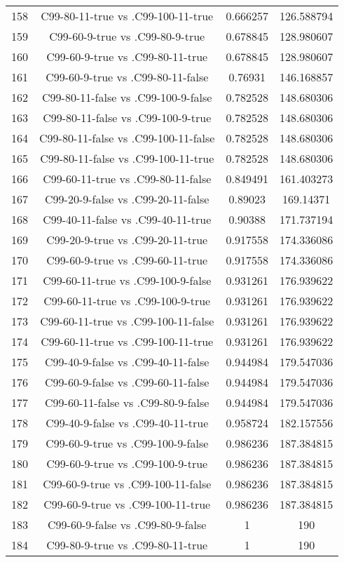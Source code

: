 \documentclass[a4paper,10pt]{article}
\begin{document}
\begin{landscape}
\begin{table}[!htp]
\begin{tabular}{cccc}
158&C99-80-11-true vs .C99-100-11-true&0.666257&126.588794\\
159&C99-60-9-true vs .C99-80-9-true&0.678845&128.980607\\
160&C99-60-9-true vs .C99-80-11-true&0.678845&128.980607\\
161&C99-60-9-true vs .C99-80-11-false&0.76931&146.168857\\
162&C99-80-11-false vs .C99-100-9-false&0.782528&148.680306\\
163&C99-80-11-false vs .C99-100-9-true&0.782528&148.680306\\
164&C99-80-11-false vs .C99-100-11-false&0.782528&148.680306\\
165&C99-80-11-false vs .C99-100-11-true&0.782528&148.680306\\
166&C99-60-11-true vs .C99-80-11-false&0.849491&161.403273\\
167&C99-20-9-false vs .C99-20-11-false&0.89023&169.14371\\
168&C99-40-11-false vs .C99-40-11-true&0.90388&171.737194\\
169&C99-20-9-true vs .C99-20-11-true&0.917558&174.336086\\
170&C99-60-9-true vs .C99-60-11-true&0.917558&174.336086\\
171&C99-60-11-true vs .C99-100-9-false&0.931261&176.939622\\
172&C99-60-11-true vs .C99-100-9-true&0.931261&176.939622\\
173&C99-60-11-true vs .C99-100-11-false&0.931261&176.939622\\
174&C99-60-11-true vs .C99-100-11-true&0.931261&176.939622\\
175&C99-40-9-false vs .C99-40-11-false&0.944984&179.547036\\
176&C99-60-9-false vs .C99-60-11-false&0.944984&179.547036\\
177&C99-60-11-false vs .C99-80-9-false&0.944984&179.547036\\
178&C99-40-9-false vs .C99-40-11-true&0.958724&182.157556\\
179&C99-60-9-true vs .C99-100-9-false&0.986236&187.384815\\
180&C99-60-9-true vs .C99-100-9-true&0.986236&187.384815\\
181&C99-60-9-true vs .C99-100-11-false&0.986236&187.384815\\
182&C99-60-9-true vs .C99-100-11-true&0.986236&187.384815\\
183&C99-60-9-false vs .C99-80-9-false&1&190\\
184&C99-80-9-true vs .C99-80-11-true&1&190\\

\end{tabular}
\end{table}
\end{landscape}
\end{document}
